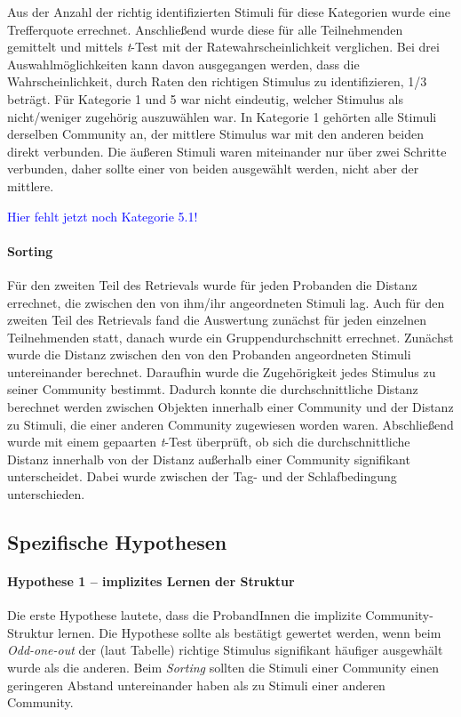 \documentclass[preprint,12pt]{elsarticle}
\begin{document}
Aus der Anzahl der richtig identifizierten Stimuli für diese Kategorien wurde eine Trefferquote errechnet. Anschließend wurde diese für alle Teilnehmenden gemittelt und mittels \textit{t}-Test mit der Ratewahrscheinlichkeit verglichen. Bei drei Auswahlmöglichkeiten kann davon ausgegangen werden, dass die Wahrscheinlichkeit, durch Raten den richtigen Stimulus zu identifizieren, 1/3 beträgt.
Für Kategorie 1 und 5 war nicht eindeutig, welcher Stimulus als nicht/weniger zugehörig auszuwählen war. In Kategorie 1 gehörten alle Stimuli derselben Community an, der mittlere Stimulus war mit den anderen beiden direkt verbunden. Die äußeren Stimuli waren miteinander nur über zwei Schritte verbunden, daher sollte einer von beiden ausgewählt werden, nicht aber der mittlere.

\textcolor{blue}{Hier fehlt jetzt noch Kategorie 5.1!}

\paragraph{Sorting}
Für den zweiten Teil des Retrievals wurde für jeden Probanden die Distanz errechnet, die zwischen den von ihm/ihr angeordneten Stimuli lag.
Auch für den zweiten Teil des Retrievals fand die Auswertung zunächst für jeden einzelnen Teilnehmenden statt, danach wurde ein Gruppendurchschnitt errechnet. Zunächst wurde die Distanz zwischen den von den Probanden angeordneten Stimuli untereinander berechnet. Daraufhin wurde die Zugehörigkeit jedes Stimulus zu seiner Community bestimmt. Dadurch konnte die durchschnittliche Distanz berechnet werden zwischen Objekten innerhalb einer Community und der Distanz zu Stimuli, die einer anderen Community zugewiesen worden waren. Abschließend wurde mit einem gepaarten \textit{t}-Test überprüft, ob sich die durchschnittliche Distanz innerhalb von der Distanz außerhalb einer Community signifikant unterscheidet. Dabei wurde zwischen der Tag- und der Schlafbedingung unterschieden.

\subsection{Spezifische Hypothesen}

\paragraph{Hypothese 1 – implizites Lernen der Struktur}
Die erste Hypothese lautete, dass die ProbandInnen die implizite Community-Struktur lernen.
Die Hypothese sollte als bestätigt gewertet werden, wenn beim \textit{Odd-one-out} der (laut Tabelle) richtige Stimulus signifikant häufiger ausgewhält wurde als die anderen. Beim \textit{Sorting} sollten die Stimuli einer Community einen geringeren Abstand untereinander haben als zu Stimuli einer anderen Community.
\end{document}

